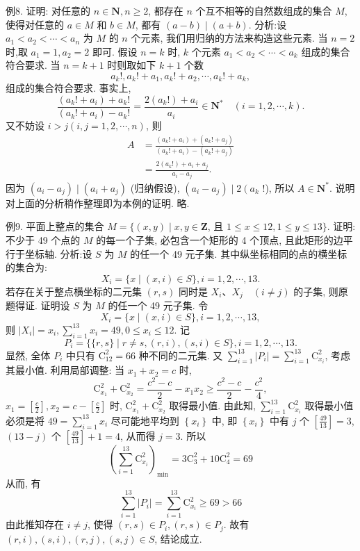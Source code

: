 例8. 证明: 对任意的 $n \in \mathbf{N}, n \geqslant 2$, 都存在 $n$ 个互不相等的自然数组成的集合 $M$, 使得对任意的 $a \in M$ 和 $b \in M$, 都有 $(a-b) \mid(a+b)$.
分析:设 $a_1<a_2<\cdots<a_n$ 为 $M$ 的 $n$ 个元素, 我们用归纳的方法来构造这些元素.
当 $n=2$ 时,取 $a_1=1, a_2=2$ 即可.
假设 $n=k$ 时, $k$ 个元素 $a_1<a_2<\cdots<a_k$ 组成的集合符合要求.
当 $n=k+1$ 时则取如下 $k+1$ 个数
$$
a_{k} !, a_{k} !+a_1, a_{k} !+a_2, \cdots, a_{k} !+a_k,
$$
组成的集合符合要求.
事实上,
$$
\frac{\left(a_{k} !+a_i\right)+a_{k} !}{\left(a_{k} !+a_i\right)-a_{k} !}=\frac{2\left(a_{k} !\right)+a_i}{a_i} \in \mathbf{N}^* \quad(i=1,2, \cdots, k) .
$$
又不妨设 $i>j(i, j=1,2, \cdots, n)$, 则
$$
\begin{aligned}
A & =\frac{\left(a_{k} !+a_i\right)+\left(a_{k} !+a_j\right)}{\left(a_{k} !+a_i\right)-\left(a_{k} !+a_j\right)} \\
& =\frac{2\left(a_{k} !\right)+a_i+a_j}{a_i-a_j} .
\end{aligned}
$$
因为 $\left(a_i-a_j\right) \mid\left(a_i+a_j\right)$ (归纳假设), $\left(a_i-a_j\right) \mid 2\left(a_k\right.$ !), 所以 $A \in \mathbf{N}^*$.
说明对上面的分析稍作整理即为本例的证明.
略.



例9. 平面上整点的集合 $M=\{(x, y) \mid x, y \in \mathbf{Z}$, 且 $1 \leqslant x \leqslant 12,1 \leqslant y \leqslant 13\}$. 证明: 不少于 49 个点的 $M$ 的每一个子集, 必包含一个矩形的 4 个顶点, 且此矩形的边平行于坐标轴.
分析:设 $S$ 为 $M$ 的任一个 49 元子集.
其中纵坐标相同的点的横坐标的集合为:
$$
X_i=\{x \mid(x, i) \in S\}, i=1,2, \cdots, 13 .
$$
若存在关于整点横坐标的二元集 $(r, s)$ 同时是 $X_i 、 X_j \quad(i \neq j)$ 的子集, 则原题得证.
证明设 $S$ 为 $M$ 的任一个 49 元子集.
令
$$
X_i=\{x \mid(x, i) \in S\}, i=1,2, \cdots, 13,
$$
则 $\left|X_i\right|=x_i, \sum_{i=1}^{13} x_i=49,0 \leqslant x_i \leqslant 12$. 记
$$
P_i=\{\{r, s\} \mid r \neq s,(r, i),(s, i) \in S\}, i=1,2, \cdots, 13 .
$$
显然, 全体 $P_i$ 中只有 $\mathrm{C}_{12}^2=66$ 种不同的二元集.
又 $\sum_{i=1}^{13}\left|P_i\right|=\sum_{i=1}^{13} \mathrm{C}_{x_i}^2$, 考虑其最小值.
利用局部调整: 当 $x_1+x_2=c$ 时,
$$
\mathrm{C}_{x_1}^2+\mathrm{C}_{x_2}^2=\frac{c^2-c}{2}-x_1 x_2 \geqslant \frac{c^2-c}{2}-\frac{c^2}{4},
$$
$x_1=\left[\frac{c}{2}\right], x_2=c-\left[\frac{c}{2}\right]$ 时, $\mathrm{C}_{x_1}^2+\mathrm{C}_{x_2}^2$ 取得最小值.
由此知, $\sum_{i=1}^{13} \mathrm{C}_{x_i}^2$ 取得最小值必须是将 $49=\sum_{i=1}^{13} x_i$ 尽可能地平均到 $\left\{x_i\right\}$ 中, 即 $\left\{x_i\right\}$ 中有 $j$ 个 $\left[\frac{49}{13}\right]=3$, $(13-j)$ 个 $\left[\frac{49}{13}\right]+1=4$, 从而得 $j=3$.
所以
$$
\left(\sum_{i=1}^{13} \mathrm{C}_{x_i}^2\right)_{\min }=3 \mathrm{C}_3^2+10 \mathrm{C}_4^2=69
$$
从而, 有
$$
\sum_{i=1}^{13}\left|P_i\right|=\sum_{i=1}^{13} \mathrm{C}_{x_i}^2 \geqslant 69>66
$$
由此推知存在 $i \neq j$, 使得 $(r, s) \in P_i,(r, s) \in P_j$.
故有 $(r, i),(s, i),(r, j),(s, j) \in S$, 结论成立.



